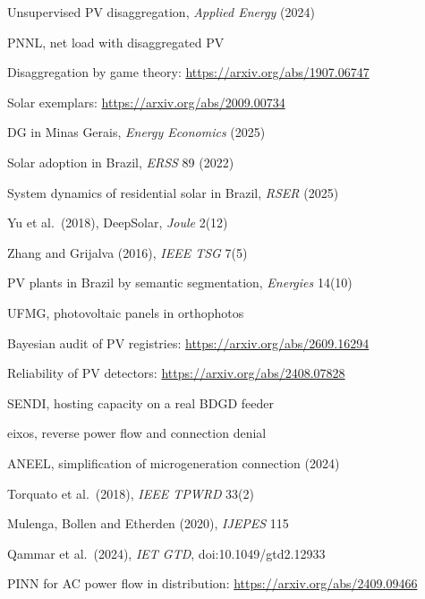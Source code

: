 {\begin{enumerate}[label={[\arabic*]},leftmargin=2.2em,itemsep=1pt]
\item Unsupervised PV disaggregation, \emph{Applied Energy} (2024)
\item PNNL, net load with disaggregated PV
\item Disaggregation by game theory: \url{https://arxiv.org/abs/1907.06747}
\item Solar exemplars: \url{https://arxiv.org/abs/2009.00734}
\item DG in Minas Gerais, \emph{Energy Economics} (2025)
\item Solar adoption in Brazil, \emph{ERSS} 89 (2022)
\item System dynamics of residential solar in Brazil, \emph{RSER} (2025)
\item Yu et al.\ (2018), DeepSolar, \emph{Joule} 2(12)
\item Zhang and Grijalva (2016), \emph{IEEE TSG} 7(5)
\item PV plants in Brazil by semantic segmentation, \emph{Energies} 14(10)
\item UFMG, photovoltaic panels in orthophotos
\item Bayesian audit of PV registries: \url{https://arxiv.org/abs/2609.16294}
\item Reliability of PV detectors: \url{https://arxiv.org/abs/2408.07828}
\item SENDI, hosting capacity on a real BDGD feeder
\item eixos, reverse power flow and connection denial
\item ANEEL, simplification of microgeneration connection (2024)
\item Torquato et al.\ (2018), \emph{IEEE TPWRD} 33(2)
\item Mulenga, Bollen and Etherden (2020), \emph{IJEPES} 115
\item Qammar et al.\ (2024), \emph{IET GTD}, doi:10.1049/gtd2.12933
\item PINN for AC power flow in distribution: \url{https://arxiv.org/abs/2409.09466}
\end{enumerate}}
